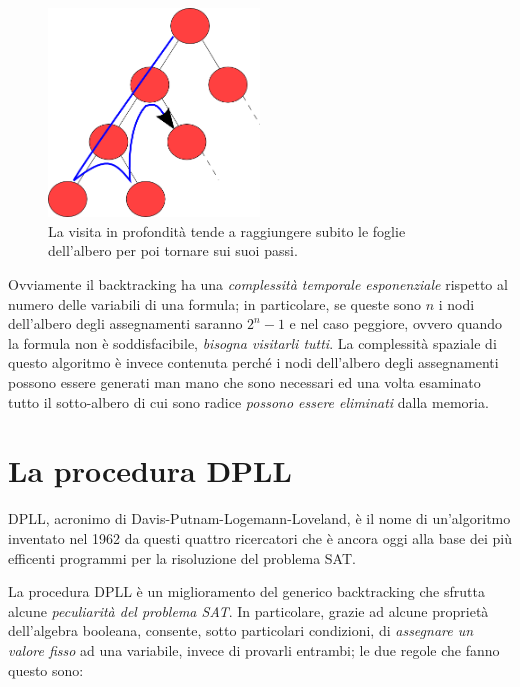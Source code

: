 \documentclass[12pt, a4paper, twosides]{report}
\begin{document}
\begin{figure}[ht]
\begin{center}
\includegraphics[width=0.5\textwidth]{depthfirst.png}
\end{center}
\caption{La visita in profondità tende a raggiungere subito le foglie dell'albero per poi tornare sui suoi passi.}
\end{figure}

Ovviamente il backtracking ha una \textit{complessità temporale esponenziale} rispetto al numero delle variabili di una formula; in particolare, se queste sono $n$ i nodi dell'albero degli assegnamenti saranno $2^{n}-1$ e nel caso peggiore, ovvero quando la formula non è soddisfacibile, \textit{bisogna visitarli tutti}. La complessità spaziale di questo algoritmo è invece contenuta perché i nodi dell'albero degli assegnamenti possono essere generati man mano che sono necessari ed una volta esaminato tutto il sotto-albero di cui sono radice \textit{possono essere eliminati} dalla memoria.





\section{La procedura DPLL}

DPLL, acronimo di Davis-Putnam-Logemann-Loveland, è il nome di un'algoritmo inventato nel 1962 da questi quattro ricercatori che è ancora oggi alla base dei più efficenti programmi per la risoluzione del problema SAT.

La procedura DPLL è un miglioramento del generico backtracking che sfrutta alcune \textit{peculiarità del problema SAT}. In particolare, grazie ad alcune proprietà dell'algebra booleana, consente, sotto particolari condizioni, di \textit{assegnare un valore fisso} ad una variabile, invece di provarli entrambi; le due regole che fanno questo sono:
\end{document}
